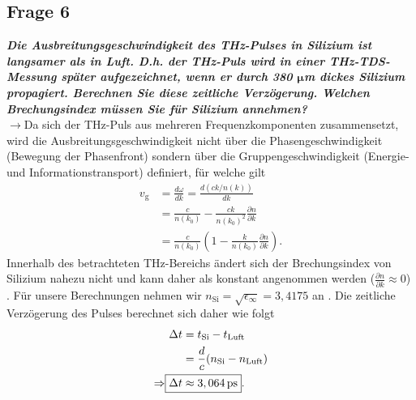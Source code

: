 \subsection{\label{subsec:FZV6}Frage 6}
\textbf{\textit{Die Ausbreitungsgeschwindigkeit des THz-Pulses in Silizium ist langsamer als in
Luft. D.h. der THz-Puls wird in einer THz-TDS-Messung später aufgezeichnet,
wenn er durch 380 $\mathbf{\mu}$m dickes Silizium propagiert. Berechnen Sie diese zeitliche
Verzögerung. Welchen Brechungsindex müssen Sie für Silizium annehmen?}}\\
$\rightarrow$Da sich der THz-Puls aus mehreren Frequenzkomponenten zusammensetzt, wird 
die Ausbreitungsgeschwindigkeit nicht über die Phasengeschwindigkeit (Bewegung der Phasenfront)
sondern über die Gruppengeschwindigkeit (Energie- und Informationstransport) definiert,
für welche gilt
\begin{align}
    v_{\text{g}} &= \frac{d\omega}{dk} = \frac{d(ck/n(k))}{dk} \\
    &= \frac{c}{n(k_{0})} - \frac{ck}{n(k_{0})^{2}}\frac{\partial n}{\partial k} \\
    &= \frac{c}{n(k_{0})}\left(1 - \frac{k}{n(k_{0})}\frac{\partial n}{\partial k}\right).
\end{align}
Innerhalb des betrachteten THz-Bereichs ändert sich der Brechungsindex von Silizium nahezu nicht und kann 
daher als konstant angenommen werden ($\frac{\partial n}{\partial k}\approx0$) \cite{Q9}.
Für unsere Berechnungen nehmen wir $n_{\text{Si}} = \sqrt{\epsilon_{\infty}} = 3,4175$ an \cite{Anleitung}.
Die zeitliche Verzögerung des Pulses berechnet sich daher wie folgt
\begin{align}
    \Delta t &= t_{\text{Si}} - t_{\text{Luft}} \\
    &= \frac{d}{c}(n_{\text{Si}}-n_{\text{Luft}}) \label{eq:a22}\\
    \Rightarrow \Aboxed{\Delta t & \approx 3,064\,\si{ps}}.
\end{align}
